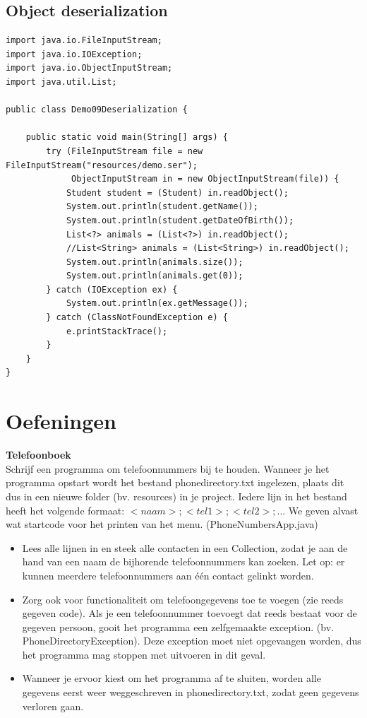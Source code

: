 \subsection{Object deserialization}

\begin{lstlisting}
import java.io.FileInputStream;
import java.io.IOException;
import java.io.ObjectInputStream;
import java.util.List;

public class Demo09Deserialization {

	public static void main(String[] args) {
		try (FileInputStream file = new FileInputStream("resources/demo.ser");
		     ObjectInputStream in = new ObjectInputStream(file)) {
			Student student = (Student) in.readObject();
			System.out.println(student.getName());
			System.out.println(student.getDateOfBirth());
			List<?> animals = (List<?>) in.readObject();
			//List<String> animals = (List<String>) in.readObject();
			System.out.println(animals.size());
			System.out.println(animals.get(0));
		} catch (IOException ex) {
			System.out.println(ex.getMessage());
		} catch (ClassNotFoundException e) {
			e.printStackTrace();
		}
	}
}
\end{lstlisting}





\section{Oefeningen}

\begin{oefening}
\textbf{Telefoonboek}\\

Schrijf een programma om telefoonnummers bij te houden.
Wanneer je het programma opstart wordt het bestand phonedirectory.txt ingelezen,
plaats dit dus in een nieuwe folder (bv. resources) in je project. Iedere lijn in het
bestand heeft het volgende formaat: $<naam>;<tel1>;<tel2>;…$
We geven alvast wat startcode voor het printen van het menu.
(PhoneNumbersApp.java)
\begin{itemize}
\item Lees alle lijnen in en steek alle contacten in een Collection, zodat je aan de hand van
een naam de bijhorende telefoonnummers kan zoeken. Let op: er kunnen meerdere
telefoonnummers aan één contact gelinkt worden.
\item Zorg ook voor functionaliteit om telefoongegevens toe te voegen (zie reeds gegeven
code). Als je een telefoonnummer toevoegt dat reeds bestaat voor de gegeven
persoon, gooit het programma een zelfgemaakte exception. (bv.
PhoneDirectoryException). Deze exception moet niet opgevangen worden, dus het
programma mag stoppen met uitvoeren in dit geval.
\item Wanneer je ervoor kiest om het programma af te sluiten, worden alle gegevens eerst
weer weggeschreven in phonedirectory.txt, zodat geen gegevens verloren gaan.
\end{itemize}
\end{oefening}

